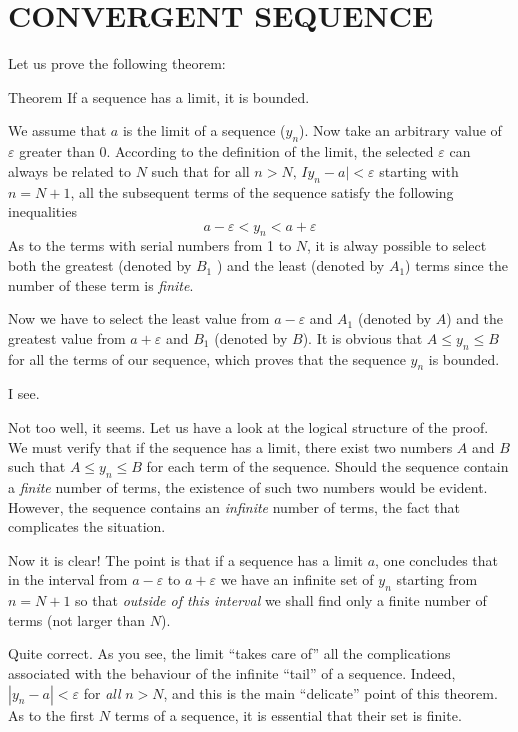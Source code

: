 
\chapter{CONVERGENT SEQUENCE}
\label{conv-seq}
{\parindent=0pt
\athr Let us prove the following theorem: 
\begin{mytheo}{Theorem}
If a sequence has a limit, it is bounded.
\label{limit-bound}
\end{mytheo}
We assume that $a$ is the limit of a sequence ($y_{n}$). Now take an arbitrary value of $\varepsilon$ greater than 0. According to the definition of the limit, the selected $\varepsilon$ can always be related to $N$ such that for all $n > N, \, Iy_{n} -a | < \varepsilon$ starting with $n = N + 1$, all the subsequent terms of the sequence satisfy the following inequalities
\begin{equation*}
a - \varepsilon < y_{n} < a + \varepsilon 
\end{equation*}
As to the terms with serial numbers from 1 to $N$, it is alway possible to select both the greatest (denoted by $B_{1}$ ) and the least (denoted by $A_{1}$) terms since the number of these term is \emph{finite}.

Now we have to select the least value from $a - \varepsilon$ and $A_{1}$ (denoted by $A$) and the greatest value from $a + \varepsilon$ and $B_{1}$ (denoted by $B$). It is obvious that $A \leqslant y_{n} \leqslant B$ for all the terms of our sequence, which proves that the sequence $y_{n}$ is bounded.

\rdr I see.

\athr Not too well, it seems. Let us have a look at the logical structure of the proof. We must verify that if the sequence has a limit, there exist two numbers $A$ and $B$ such that $A \leqslant y_{n} \leqslant B$ for each term of the sequence. Should the sequence contain a \emph{finite} number of terms, the existence of such two numbers would be evident. However, the sequence contains an \emph{infinite} number of terms, the fact that complicates the situation. 

\rdr Now it is clear! The point is that if a sequence has a limit $a$, one concludes that in the interval from $a - \varepsilon$ to $a + \varepsilon$ we have an infinite set of $y_{n}$ starting from $n = N +1$ so that \emph{outside of this interval} we shall find only a finite number of terms (not larger than $N$).

\athr Quite correct. As you see, the limit ``takes care of'' all the complications associated with the behaviour of the infinite ``tail'' of a sequence. Indeed, $| y_{n} - a | < \varepsilon$ for \emph{all} $n > N$, and this is the main ``delicate'' point of this theorem. As to the first $N$ terms of a sequence, it is essential that their set is finite.

}
